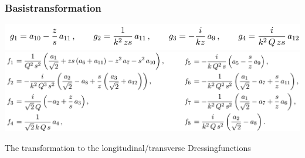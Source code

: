 \begin{frame}\frametitle{Basistransformation}
  \begin{minipage}[r]{1.\textwidth}
  	\hspace{2mm}
  	\includegraphics[scale=0.8]{gs.pdf}
  	\vspace{4mm}
  	\includegraphics[scale=0.7]{fs.png}
  \end{minipage}

  \small The transformation to the longitudinal/transverse Dressingfunctions

  \vspace{3mm}
\end{frame}

\endinput
